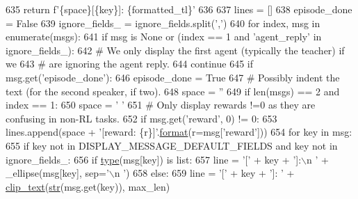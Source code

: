 \begin{DoxyCode}
635         \textcolor{keywordflow}{return} f\textcolor{stringliteral}{'\{space\}[\{key\}]: \{formatted\_tl\}'}
636 
637     lines = []
638     episode\_done = \textcolor{keyword}{False}
639     ignore\_fields\_ = ignore\_fields.split(\textcolor{stringliteral}{','})
640     \textcolor{keywordflow}{for} index, msg \textcolor{keywordflow}{in} enumerate(msgs):
641         \textcolor{keywordflow}{if} msg \textcolor{keywordflow}{is} \textcolor{keywordtype}{None} \textcolor{keywordflow}{or} (index == 1 \textcolor{keywordflow}{and} \textcolor{stringliteral}{'agent\_reply'} \textcolor{keywordflow}{in} ignore\_fields\_):
642             \textcolor{comment}{# We only display the first agent (typically the teacher) if we}
643             \textcolor{comment}{# are ignoring the agent reply.}
644             \textcolor{keywordflow}{continue}
645         \textcolor{keywordflow}{if} msg.get(\textcolor{stringliteral}{'episode\_done'}):
646             episode\_done = \textcolor{keyword}{True}
647         \textcolor{comment}{# Possibly indent the text (for the second speaker, if two).}
648         space = \textcolor{stringliteral}{''}
649         \textcolor{keywordflow}{if} len(msgs) == 2 \textcolor{keywordflow}{and} index == 1:
650             space = \textcolor{stringliteral}{'   '}
651         \textcolor{comment}{# Only display rewards !=0 as they are confusing in non-RL tasks.}
652         \textcolor{keywordflow}{if} msg.get(\textcolor{stringliteral}{'reward'}, 0) != 0:
653             lines.append(space + \textcolor{stringliteral}{'[reward: \{r\}]'}.\hyperlink{namespaceparlai_1_1chat__service_1_1services_1_1messenger_1_1shared__utils_a32e2e2022b824fbaf80c747160b52a76}{format}(r=msg[\textcolor{stringliteral}{'reward'}]))
654         \textcolor{keywordflow}{for} key \textcolor{keywordflow}{in} msg:
655             \textcolor{keywordflow}{if} key \textcolor{keywordflow}{not} \textcolor{keywordflow}{in} DISPLAY\_MESSAGE\_DEFAULT\_FIELDS \textcolor{keywordflow}{and} key \textcolor{keywordflow}{not} \textcolor{keywordflow}{in} ignore\_fields\_:
656                 \textcolor{keywordflow}{if} \hyperlink{namespaceparlai_1_1agents_1_1tfidf__retriever_1_1build__tfidf_ad5dfae268e23f506da084a9efb72f619}{type}(msg[key]) \textcolor{keywordflow}{is} list:
657                     line = \textcolor{stringliteral}{'['} + key + \textcolor{stringliteral}{']:\(\backslash\)n  '} + \_ellipse(msg[key], sep=\textcolor{stringliteral}{'\(\backslash\)n  '})
658                 \textcolor{keywordflow}{else}:
659                     line = \textcolor{stringliteral}{'['} + key + \textcolor{stringliteral}{']: '} + \hyperlink{namespaceparlai_1_1utils_1_1misc_a219b248f4399036a381ca859aa97433e}{clip\_text}(\hyperlink{namespacegenerate__task__READMEs_a5b88452ffb87b78c8c85ececebafc09f}{str}(msg.get(key)), max\_len)

\end{DoxyCode}
